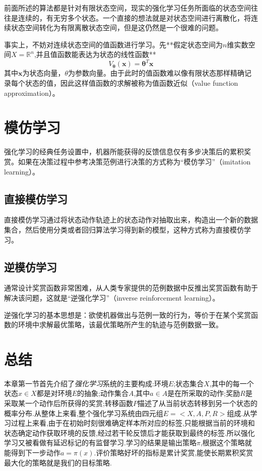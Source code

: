 前面所述的算法都是针对有限状态空间，现实的强化学习任务所面临的状态空间往往是连续的，有无穷多个状态。一个直接的想法就是对状态空间进行离散化，将连续状态空间转化为有限离散状态空间，但是这仍然是一个很难的问题。

事实上，不妨对连续状态空间的值函数进行学习。先**假定状态空间为$n$维实数空间$X=\mathbb R^n$,并且值函数能表达为状态的线性函数**
\begin{equation}
V_{\mathbf \theta}(\mathbf x)=\mathbf\theta^T\mathbf x
\end{equation}
其中$\mathbf x$为状态向量，$\theta$为参数向量。由于此时的值函数难以像有限状态那样精确记录每个状态的值，因此这样值函数的求解被称为值函数近似（value function approximation）。

\section{模仿学习}

强化学习的经典任务设置中，机器所能获得的反馈信息仅有多步决策后的累积奖赏。如果在决策过程中参考决策范例进行决策的方式称为``模仿学习''（imitation learning）。

\subsection{直接模仿学习}

直接模仿学习通过将状态动作轨迹上的状态动作对抽取出来，构造出一个新的数据集合，然后使用分类或者回归算法学习得到新的模型，这种方式称为直接模仿学习。

\subsection{逆模仿学习}

通常设计奖赏函数非常困难，从人类专家提供的范例数据中反推出奖赏函数有助于解决该问题，这就是``逆强化学习''（inverse reinforcement learning）。

逆强化学习的基本思想是：欲使机器做出与范例一致的行为，等价于在某个奖赏函数的环境中求解最优策略，该最优策略所产生的轨迹与范例数据一致。

\section*{总结}

本章第一节首先介绍了\textit{强化学习}系统的主要构成:环境$E$;状态集合$X$,其中的每一个状态$x\in X$都是对环境$E$的抽象;动作集合$A$,其中$a\in A$是在所采取的动作;奖励$R$是采取某一个动作后所获得的奖赏;转移函数$P$描述了从当前状态转移到另一个状态的概率分布.从整体上来看,整个强化学习系统由四元组$E=<X,A,P,R>$组成.从学习过程上来看,由于在初始时刻很难确定样本所对应的标签,只能根据当前的环境和状态确定动作获取环境的反馈,经过若干轮反馈后才能获取到最终的标签.所以强化学习又被看做有延迟标记的有监督学习.学习的结果是输出策略$\pi$,根据这个策略就能得到下一步动作$a=\pi(x)$.评价策略好坏的指标是累计奖赏,能使长期累积奖赏最大化的策略就是我们的目标策略.

